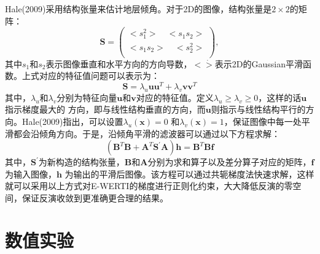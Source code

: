 Hale(2009)\cite{Hale2009Structure}采用结构张量来估计地层倾角。对于2D的图像，结构张量是$2\times2$的矩阵：
\begin{equation}
        \mathbf{S}=
        \begin{pmatrix}
                < s^2_1 > \quad <s_1s_2 >\\
                < s_1s_2 > \quad < s^2_2 >\\
        \end{pmatrix},
        \label{eq:StructureTensor}
\end{equation}
其中$s_1$和$s_2$表示图像垂直和水平方向的方向导数，$<\dot>$表示2D的Gaussian平滑函数。上式对应的特征值问题可以表示为：
\begin{equation}
	\mathbf{S}=\lambda_u\mathbf{u}\mathbf{u}^T+\lambda_v\mathbf{v}\mathbf{v}^T
        \label{eq:EigenValueVector}
\end{equation}
其中，$\lambda_u$和$\lambda_v$分别为特征向量$\mathbf{u}$和$\mathbf{v}$对应的特征值。定义$\lambda_u\ge\lambda_v\ge0$，这样的话$\mathbf{u}$指示梯度最大的
方向，即与线性结构垂直的方向，而$\mathbf{u}$则指示与线性结构平行的方向。Hale(2009)\cite{Hale2009Structure}指出，可以设置$\lambda_u(\mathbf{x})=0$
和$\lambda_v(\mathbf{x})=1$，保证图像中每一处平滑都会沿倾角方向。于是，沿倾角平滑的滤波器可以通过以下方程求解：
\begin{equation}
	(\mathbf{B}^T\mathbf{B}+\mathbf{A}^T\mathbf{S}^{\prime}\mathbf{A})\mathbf{h}=\mathbf{B}^T\mathbf{B}\mathbf{f}
        \label{eq:SparseMatrixSystem}
\end{equation}
其中，$\mathbf{S}^{\prime}$为新构造的结构张量，$\mathbf{B}$和$\mathbf{A}$分别为求和算子以及差分算子对应的矩阵，$\mathbf{f}$为输入图像，$\mathbf{h}$
为输出的平滑后图像。该方程可以通过共轭梯度法快速求解，这样就可以采用以上方式对E-WERTI的梯度进行正则化约束，大大降低反演的零空间，保证反演收敛到更准确更合理的结果。

\section{数值实验}
